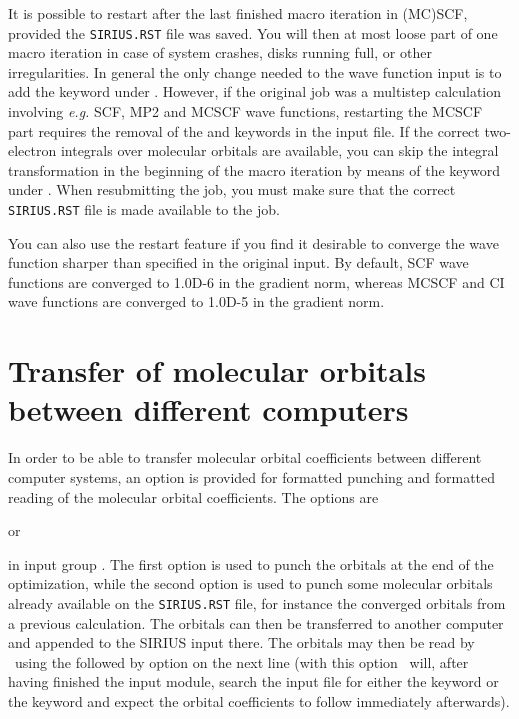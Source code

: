 It is possible to restart after the last finished
macro iteration in (MC)SCF, provided the \verb|SIRIUS.RST|
file was saved.  You will then at most
loose part of one macro iteration in case of system crashes, disks
running full, or other irregularities. \noindent In general the
only change needed to the wave function input is to add the
 keyword under . However, if the
original job was a multistep calculation involving {\it e.g.\/} SCF,
MP2 and MCSCF wave functions, restarting the MCSCF part requires the
removal of the  and  keywords in the input
file. If the correct
two-electron integrals over molecular orbitals are available, you
can skip the integral transformation 
in the beginning of the macro iteration by means
of the  keyword under
. When resubmitting the job, you must make
sure that the correct \verb|SIRIUS.RST| file is
made available to the job.

\noindent
You can also use the restart feature if you find it desirable to
converge the wave function sharper
than specified in the original input. By default, SCF wave
functions are converged to 1.0D-6 in the gradient norm, whereas MCSCF
and CI wave functions are converged to 1.0D-5 in the gradient norm. 

\pagebreak[2]
\section{\label{sec:ig_orbtransfer}
Transfer of molecular orbitals between different computers}

In order to be able to transfer molecular orbital coefficients between
different computer systems,
an option is provided for
formatted punching and formatted reading of the molecular orbital
coefficients.  The options are
\begin{center}
    or 
\end{center}
in input group . The first option is used to
punch the orbitals at the end of the optimization, while the
second option is used to punch some molecular
orbitals already available on the \verb|SIRIUS.RST|
file, for instance the converged
orbitals from a previous calculation.  The orbitals can then be
transferred to another computer and appended to the SIRIUS input
there. The orbitals may then be read by \siraba\ using the 
followed by  option on the next line (with this option
\siraba\ will, after having finished the 
input module, search the input file for either the 
keyword or the  keyword and expect the orbital
coefficients to follow immediately afterwards).


